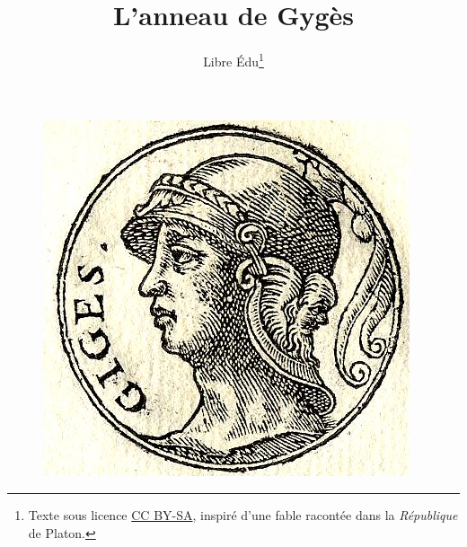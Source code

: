 \documentclass[12pt, a5paper, french]{memoir}
\title{L'anneau de Gygès}
\author{Libre Édu\thanks{Texte sous licence \href{http://creativecommons.org/licenses/by-sa/4.0/deed.fr}{CC BY-SA}, inspiré d’une fable racontée dans la \textit{République} de Platon.}}
\begin{document}
\maketitle
\thispagestyle{empty}
\vfill
\begin{figure}[h]
\centering
\includegraphics[scale=1]{Gyges.jpg}
\end{figure}
\vfill

\newpage
\renewcommand\contentsname{Sommaire}
\tableofcontents*
\thispagestyle{empty}

\DramPer*
\thispagestyle{empty}
\end{document}
